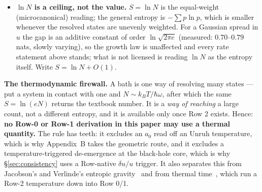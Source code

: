 \documentclass[11pt]{article}
\begin{document}
\begin{itemize}[leftmargin=1.4em,itemsep=2.5pt,topsep=3pt]
  is the $N=1$ boundary condition, and \emph{that} is what the rows supply. DTF contributes the piece
  Boltzmann must assume and inherits the piece he already had. The mechanism that grows $\sigma_u$ from the synced state is gravitational clumping, argued from the sign of the instability rather than simulated (O5).
\item \textbf{$\ln N$ is a ceiling, not the value.} $S=\ln N$ is the equal-weight (microcanonical) reading;
  the general entropy is $-\sum p\ln p$, which is smaller whenever the resolved states are unevenly weighted.
  For a Gaussian spread in $u$ the gap is an additive constant of order $\ln\sqrt{2\pi e}$ (measured:
  $0.70$--$0.79$ nats, slowly varying), so the growth law is unaffected and every rate statement above stands;
  what is not licensed is reading $\ln N$ as the entropy itself. Write $S=\ln N+O(1)$.
\end{itemize}

\begin{tcolorbox}[keybox]
\textbf{The thermodynamic firewall.} A bath is one way of resolving many states --- put a system in contact
with one and $N\sim k_BT/\hbar\omega$, after which the same $S=\ln(eN)$ returns the textbook number. It is a
\emph{way of reaching} a large count, not a different entropy, and it is available only once Row 2 exists.
Hence: \textbf{no Row-0 or Row-1 derivation in this paper may use a thermal quantity.} The rule has teeth: it
excludes an $a_0$ read off an Unruh temperature, which is why Appendix~B takes the geometric route, and it
excludes a temperature-triggered de-emergence at the black-hole core, which is why \S\ref{sec:consistency} uses a Row-native
$\delta u/u$ trigger. It also separates this from Jacobson's and Verlinde's entropic
gravity~\cite{Jacobson1995,Verlinde2011} and from thermal time~\cite{ConnesRovelli1994}, which run a Row-2
temperature down into Row 0/1.
\end{tcolorbox}
\end{document}
